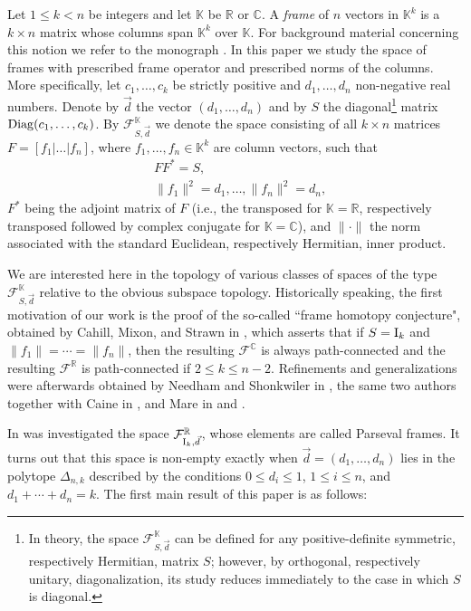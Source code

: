 \documentclass[12pt]{amsart}
\theoremstyle{definition}
\theoremstyle{remark}
\newcommand{\RR}{\mathbb R}
\newcommand{\CC}{\mathbb C}
\newcommand{\KK}{\mathbb K}
\begin{document}
Let $1\le k <n$ be integers and let $\KK$ be $\RR$ or $\CC$. A {\it frame} of $n$ vectors in $\KK^k$ is a $k\times n$ matrix whose columns span $\KK^k$ over $\KK$. For background material concerning this notion we refer to the monograph \cite{Wa}. 
 In this paper we study the space of frames with prescribed frame operator and prescribed norms of the columns. More specifically,  let $c_1, \ldots, c_k $ be strictly positive and  $d_1, \ldots, d_n$ non-negative real numbers. 
Denote by $\vec{d}$ the vector $(d_1, \ldots, d_n)$ and by $S$ the diagonal\footnote{In theory, the space ${\mathcal F}_{S, \vec{d}}^\KK$ can be defined for any positive-definite symmetric, respectively Hermitian, matrix $S$; however, by orthogonal, respectively unitary, diagonalization, its study reduces immediately to the case in which $S$ is diagonal.} matrix ${\rm Diag}(c_1, \ldots, c_k)$.  %
By  ${\mathcal F}_{S, \vec{d}}^\KK$ we denote the space consisting of all $k\times n$ matrices $F=[f_1 | \ldots | f_n]$, where
$f_1, \ldots, f_n \in \KK^k$ are column vectors, such that
\begin{align*}
{}& FF^*=S,\\
{}& \|f_1\|^2=d_1, \ldots , \|f_n\|^2=d_n,
\end{align*}
$F^*$ being the adjoint matrix of $F$ (i.e., the transposed for $\KK=\RR$, respectively transposed followed by complex conjugate for $\KK=\CC$), and $\| \cdot \|$ the norm associated with the standard Euclidean, respectively Hermitian, inner product. 

We are interested here  in the topology of various classes of spaces of the type ${\mathcal F}_{S, \vec{d}}^\KK$ relative to the obvious subspace topology.   Historically speaking, the first motivation of our work is the proof of the so-called ``frame homotopy conjecture", obtained by Cahill, Mixon, and Strawn in \cite{CMS}, which asserts that if $S={\rm I}_k$ and $\|f_1\|=\cdots = \|f_n\|$, then the resulting ${\mathcal F}^\CC$ is always path-connected and the resulting ${\mathcal F}^\RR$ is path-connected if $2\le k \le n-2$. Refinements and generalizations were afterwards obtained by Needham and Shonkwiler in \cite{NS}, the same two authors together with Caine in \cite{CNS}, and Mare in \cite{Ma1} and \cite{Ma2}. 


In \cite{Ma1} was investigated the space ${\mathcal F}^\RR_{{\rm I}_k, \vec{d}}$, whose elements are called Parseval frames.  It turns out that this space is non-empty exactly when $\vec{d}=(d_1, \ldots, d_n)$  lies  in the polytope $\Delta_{n,k}$ described by the conditions $0\le d_i \le 1$, $1\le i \le n$,  and $d_1+\cdots + d_n=k$. The first main result of this paper is as follows:
\end{document}
